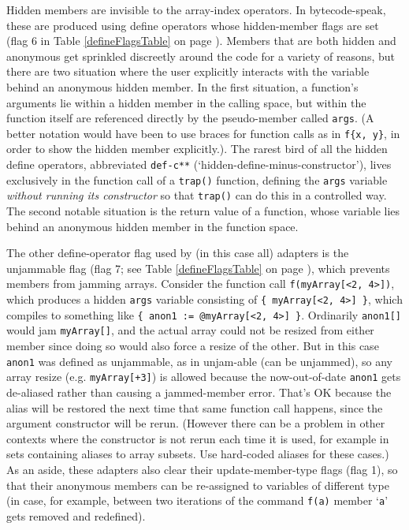 \documentclass{article}
\begin{document}
Hidden members are invisible to the array-index operators.  In bytecode-speak, these are produced using define operators whose hidden-member flags are set (flag 6 in Table \ref{defineFlagsTable} on page \pageref{defineFlagsTable}).  Members that are both hidden and anonymous get sprinkled discreetly around the code for a variety of reasons, but there are two situation where the user explicitly interacts with the variable behind an anonymous hidden member.  In the first situation, a function's arguments lie within a hidden member in the calling space, but within the function itself are referenced directly by the pseudo-member called \verb#args#.  (A better notation would have been to use braces for function calls as in \verb#f{x, y}#, in order to show the hidden member explicitly.).  The rarest bird of all the hidden define operators, abbreviated \verb#def-c**# (`hidden-define-minus-constructor'), lives exclusively in the function call of a \verb#trap()# function, defining the \verb#args# variable \emph{without running its constructor} so that \verb#trap()# can do this in a controlled way. The second notable situation is the return value of a function, whose variable lies behind an anonymous hidden member in the function space.

The other define-operator flag used by (in this case all) adapters is the unjammable flag (flag 7; see Table \ref{defineFlagsTable} on page \pageref{defineFlagsTable}), which prevents members from jamming arrays.  Consider the function call \verb#f(myArray[<2, 4>])#, which produces a hidden \verb$args$ variable consisting of \verb${ myArray[<2, 4>] }$, which compiles to something like \verb${ anon1 := @myArray[<2, 4>] }$.  Ordinarily \verb$anon1[]$ would jam \verb$myArray[]$, and the actual array could not be resized from either member since doing so would also force a resize of the other.  But in this case \verb$anon1$ was defined as unjammable, as in unjam-able (can be unjammed), so any array resize (e.g. \verb#myArray[+3]#) is allowed because the now-out-of-date \verb$anon1$ gets de-aliased rather than causing a jammed-member error.  That's OK because the alias will be restored the next time that same function call happens, since the argument constructor will be rerun.  (However there can be a problem in other contexts where the constructor is not rerun each time it is used, for example in sets containing aliases to array subsets.  Use hard-coded aliases for these cases.)  As an aside, these adapters also clear their update-member-type flags (flag 1), so that their anonymous members can be re-assigned to variables of different type (in case, for example, between two iterations of the command \verb#f(a)# member `\verb#a#' gets removed and redefined).
\end{document}
